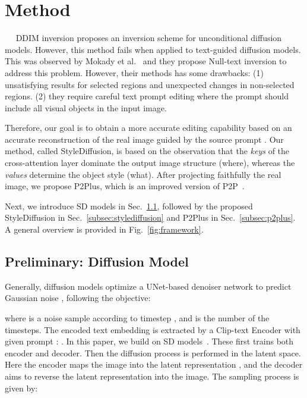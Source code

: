 \documentclass[twocolumn]{svjour3}          \smartqed  \usepackage{graphicx}
\newcommand{\minisection}[1]{\vspace{0.04in} \noindent {\bf #1}\ \ }
\begin{document}
\section{Method}

\minisection{Problem setting.} 
DDIM inversion proposes an inversion scheme for unconditional diffusion models. However, this method fails when applied to text-guided diffusion models. This was observed by Mokady et al.~\citep{mokady2022null} and they propose Null-text inversion to address this problem. However, their methods has some drawbacks:  (1) unsatisfying results for selected regions and unexpected changes in non-selected regions. (2) they require careful text prompt editing where the prompt should include all visual objects in the input image.

Therefore, our goal is to obtain a more accurate editing capability based on an accurate reconstruction of the real image  guided by the source prompt .      
Our method, called StyleDiffusion, is based on  the observation that the \emph{keys} of the cross-attention layer dominate the output image structure (where),  whereas the \emph{values} determine the object style (what). After projecting faithfully the real image, we propose P2Plus, which is an improved version of P2P~\citep{hertz2022prompt}. 

Next, we  introduce SD models in Sec.~\ref{subsec:SD_models}, followed by the proposed StyleDiffusion in Sec.~\ref{subsec:stylediffusion} and P2Plus in Sec.~\ref{subsec:p2plus}. A general overview is provided in Fig.~\ref{fig:framework}.


\subsection{Preliminary: Diffusion Model}\label{subsec:SD_models}
Generally, diffusion models optimize a UNet-based denoiser  network   to predict Gaussian noise ,  following the objective:

where  is a noise sample according to timestep , and  is the number of the timesteps.  The encoded text embedding  is extracted by a Clip-text Encoder  with given prompt : . 
In this paper, we  build on SD models~\citep{rombach2021highresolution}.  These first trains both encoder  and decoder. Then the diffusion process is performed in the latent space. Here the encoder maps the image  into the latent representation  , and the decoder aims to reverse the  latent representation   into the image.  The sampling process is given by:
\end{document}
